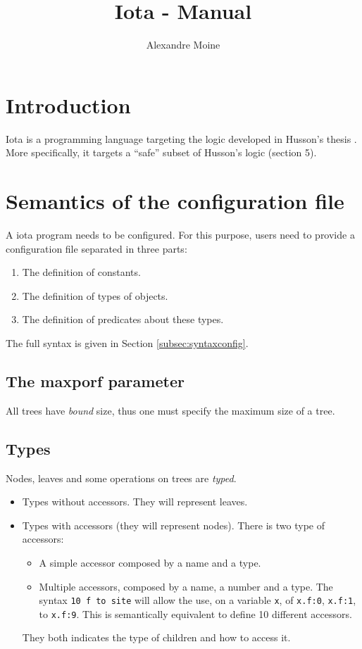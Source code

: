 \documentclass[10pt,a4paper]{article}
\author{Alexandre Moine}
\title{Iota - Manual}
\newcommand{\ocaml}{\texttt}
\begin{document}
\maketitle
\tableofcontents

\section{Introduction}
Iota is a programming language targeting the logic developed in Husson's thesis \cite{husson}. More specifically, it targets a ``safe'' subset of Husson's logic (section 5).

\section{Semantics of the configuration file}
A iota program needs to be configured. For this purpose, users need to provide a configuration file separated in three parts:
\begin{enumerate}
\item The definition of constants.
\item The definition of types of objects.
\item The definition of predicates about these types.
\end{enumerate}

The full syntax is given in Section \ref{subsec:syntaxconfig}.
\subsection{The maxporf parameter}
All trees have \emph{bound} size, thus one must specify the maximum size of a tree.

\subsection{Types}
Nodes, leaves and some operations on trees are \emph{typed}.
\begin{itemize}
\item Types without accessors. They will represent leaves.
\item Types with accessors (they will represent nodes). There is two type of accessors:
  \begin{itemize}
  \item A simple accessor composed by a name and a type.
  \item Multiple accessors, composed by a name, a number and a type. The syntax \ocaml{10 f to site} will allow the use, on a variable \ocaml{x}, of \ocaml{x.f:0}, \ocaml{x.f:1}, to \ocaml{x.f:9}. This is semantically equivalent to define 10 different accessors.
  \end{itemize}
  They both indicates the type of children and how to access it.
\end{itemize}
\end{document}
